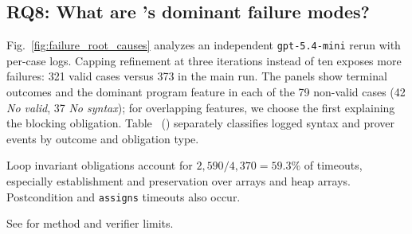 
\subsection{RQ8: What are \toolname's dominant failure modes?}
\label{subsec:rq8-failure}

Fig.~\ref{fig:failure_root_causes} analyzes an independent
\texttt{gpt-5.4-mini} rerun with per-case logs. Capping refinement at three
iterations instead of ten exposes more failures: 321 valid cases versus 373
in the main run. The panels show terminal outcomes and the dominant program
feature in each of the 79 non-valid cases (42 \emph{No valid}, 37 \emph{No
syntax}); for overlapping features, we choose the first explaining the
blocking obligation. Table~
() separately classifies logged syntax and prover
events by outcome and obligation type.

Loop invariant obligations account for \(2{,}590/4{,}370=59.3\%\) of
timeouts, especially establishment and preservation over arrays and heap
arrays. Postcondition and \texttt{assigns} timeouts also occur.

 See  for method and verifier limits.

